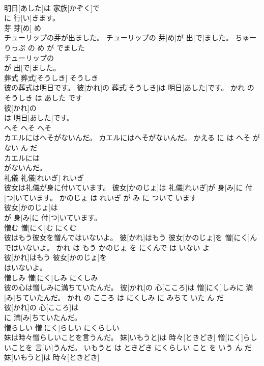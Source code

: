 \documentclass[8pt]{extreport}
\begin{document}
\begin{CJK}{UTF8}{min}
\\	明日[あした]は 家族[かぞく]で
\\	に 行[い]きます。			
\\	芽	芽[め]	め	
\\	チューリップの芽が出ました。	チューリップの 芽[め]が 出[で]ました。	ちゅーりっぷ の め が でました	
\\	チューリップの
\\	が 出[で]ました。			
\\	葬式	葬式[そうしき]	そうしき	
\\	彼の葬式は明日です。	彼[かれ]の 葬式[そうしき]は 明日[あした]です。	かれ の そうしき は あした です	
\\	彼[かれ]の
\\	は 明日[あした]です。			
\\	へそ	へそ	へそ	
\\	カエルにはへそがないんだ。	カエルにはへそがないんだ。	かえる に は へそ が ない ん だ	
\\	カエルには
\\	がないんだ。			
\\	礼儀	礼儀[れいぎ]	れいぎ	
\\	彼女は礼儀が身に付いています。	彼女[かのじょ]は 礼儀[れいぎ]が 身[み]に 付[つ]いています。	かのじょ は れいぎ が み に ついて います	
\\	彼女[かのじょ]は
\\	が 身[み]に 付[つ]いています。			
\\	憎む	憎[にく]む	にくむ	
\\	彼はもう彼女を憎んではいないよ。	彼[かれ]はもう 彼女[かのじょ]を 憎[にく]んではいないよ。	かれ は もう かのじょ を にくんで は いない よ	
\\	彼[かれ]はもう 彼女[かのじょ]を
\\	はいないよ。			
\\	憎しみ	憎[にく]しみ	にくしみ	
\\	彼の心は憎しみに満ちていたんだ。	彼[かれ]の 心[こころ]は 憎[にく]しみに 満[み]ちていたんだ。	かれ の こころ は にくしみ に みちて いた ん だ	
\\	彼[かれ]の 心[こころ]は
\\	に 満[み]ちていたんだ。			
\\	憎らしい	憎[にく]らしい	にくらしい	
\\	妹は時々憎らしいことを言うんだ。	妹[いもうと]は 時々[ときどき] 憎[にく]らしいことを 言[い]うんだ。	いもうと は ときどき にくらしい こと を いう ん だ	
\\	妹[いもうと]は 時々[ときどき]

\end{CJK}
\end{document}
